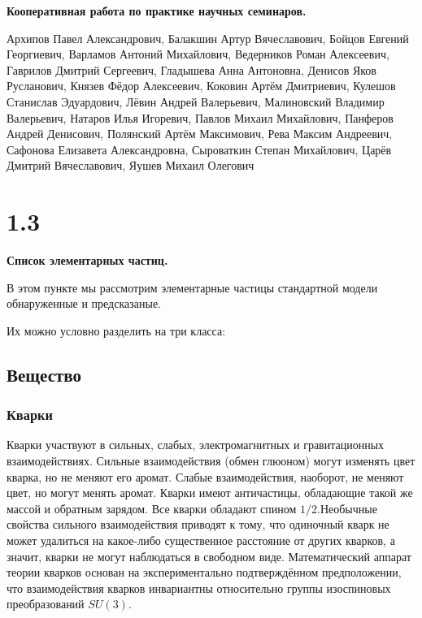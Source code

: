 \documentclass[a4paper,14pt]{article}
\begin{document}
\begin{center}
	\LARGE{\textbf{Кооперативная работа по практике научных семинаров.}}
\end{center}

\begin{center}
	\normalsize{Архипов Павел Александрович, Балакшин Артур Вячеславович, Бойцов Евгений Георгиевич, Варламов Антоний Михайлович, Ведерников Роман Алексеевич, Гаврилов Дмитрий Сергеевич, Гладышева Анна Антоновна, Денисов Яков Русланович, Князев Фёдор Алексеевич, Коковин Артём Дмитриевич, Кулешов Станислав Эдуардович, Лёвин Андрей Валерьевич, Малиновский Владимир Валерьевич, Натаров Илья Игоревич, Павлов Михаил Михайлович, Панферов Андрей Денисович, Полянский Артём Максимович, Рева Максим Андреевич, Сафонова Елизавета Александровна, Сыроваткин Степан Михайлович, Царёв Дмитрий Вячеславович, Яушев Михаил Олегович}
\end{center}

\section*{1.3}
\begin{center}
	\LARGE{\textbf{Список элементарных частиц.}}
\end{center}


В этом пункте мы рассмотрим элементарные частицы стандартной модели обнаруженные и предсказаные.

Их можно условно разделить на три класса:

\subsection*{Вещество}

\subsubsection*{Кварки}

Кварки участвуют в сильных, слабых, электромагнитных и гравитационных взаимодействиях. Сильные взаимодействия (обмен глюоном) могут изменять цвет кварка, но не меняют его аромат. Слабые взаимодействия, наоборот, не меняют цвет, но могут менять аромат. Кварки имеют античастицы, обладающие такой же массой и обратным зарядом. Все кварки обладают спином $1/2$.Необычные свойства сильного взаимодействия приводят к тому, что одиночный кварк не может удалиться на какое-либо существенное расстояние от других кварков, а значит, кварки не могут наблюдаться в свободном виде. Математический аппарат теории кварков основан на экспериментально подтверждённом предположении, что взаимодействия кварков инвариантны относительно группы изоспиновых преобразований $SU(3)$.
\end{document}

